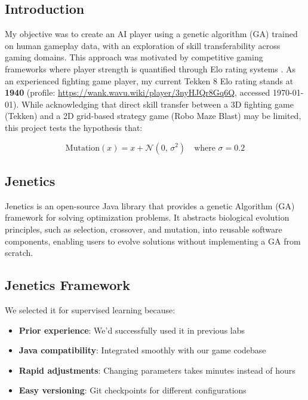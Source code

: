 \documentclass[sigconf]{acmart} %
\begin{document}
\subsection{Introduction}
My objective was to create an AI player using a genetic algorithm (GA) trained on human gameplay data, with an exploration of skill transferability across gaming domains. 
This approach was motivated by competitive gaming frameworks where player strength is quantified through Elo rating systems \cite{elo1978}. 
As an experienced fighting game player, my current Tekken 8 Elo rating stands at \textbf{1940} (profile: \url{https://wank.wavu.wiki/player/3nyHJQr8Gq6Q}, accessed \today). 
While acknowledging that direct skill transfer between a 3D fighting game (Tekken) and a 2D grid-based strategy game (Robo Maze Blast) may be limited, this project tests the hypothesis that:
\begin{center}
\end{center}
\[
\text{Mutation}(x) = x + \mathcal{N}(0,\, \sigma^2) \quad \text{where } \sigma = 0.2
\]
\subsection{Jenetics}
Jenetics is an open-source Java library that provides a genetic Algorithm (GA) framework for solving optimization problems. It abstracts biological evolution principles, such as selection, crossover, and mutation, into reusable software components, enabling users to evolve solutions without implementing a GA from scratch. 
\subsection{Jenetics Framework}
\label{subsec:jenetics}

We selected it for supervised learning because:
\begin{itemize}
    \item \textbf{Prior experience}: We'd successfully used it in previous labs
    \item \textbf{Java compatibility}: Integrated smoothly with our game codebase
    \item \textbf{Rapid adjustments}: Changing parameters takes minutes instead of hours
    \item \textbf{Easy versioning}: Git checkpoints for different configurations
\end{itemize}
\end{document}
